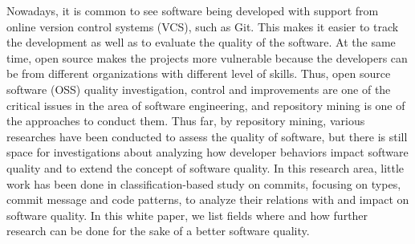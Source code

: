 Nowadays, it is common to see software being developed with support from online version control systems (VCS), such as Git. This makes it easier to track the development as well as to evaluate the quality of the software.
At the same time, open source makes the projects more vulnerable \cite{} because the developers can be from different organizations with different level of skills.
Thus, open source software (OSS) quality investigation, control and improvements are one of the critical issues in the area of software engineering, and repository mining is one of the approaches to conduct them.
Thus far, by repository mining, various researches have been conducted to assess the quality of software, but there is still space for investigations about analyzing how developer behaviors impact software quality and to extend the concept of software quality.
In this research area, little work has been done in classification-based study on commits, focusing on types, commit message and code patterns, to analyze their relations with and impact on software quality.
In this white paper, we list fields where and how further research can be done for the sake of a better software quality. 
